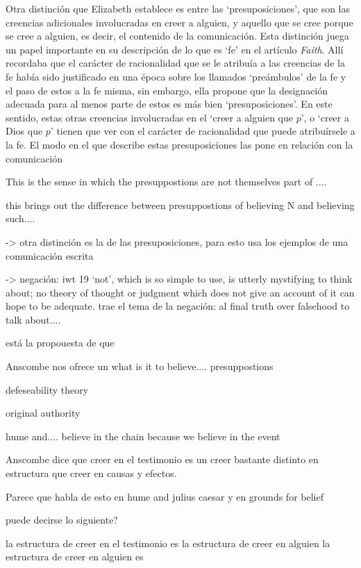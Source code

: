 Otra distinción que Elizabeth establece es entre las `presuposiciones', que son las creencias adicionales involucradas en creer a alguien, y aquello que se cree porque se cree a alguien, es decir, el contenido de la comunicación. Esta distinción juega un papel importante en su descripción de lo que es `fe' en el artículo \emph{Faith}. Allí recordaba que el carácter de racionalidad que se le atribuía a las creencias de la fe había sido justificado en una época sobre los llamados `preámbulos' de la fe y el paso de estos a la fe misma, sin embargo, ella propone que la designación adecuada para al menos parte de estos es más bien `presuposiciones'. En este sentido, estas otras creencias involucradas en el `creer a alguien que $p$', o `creer a Dios que $p$' tienen que ver con el carácter de racionalidad que puede atribuírsele a la fe. El modo en el que describe estas presuposiciones las pone en relación con la comunicación


 This is the sense in which the presuppostions are not themselves part of ....

this brings out the difference between presuppostions of believing N and believing such....



-> otra distinción es la de las presuposiciones, para esto usa los ejemplos de una comunicación escrita

-> negación: iwt 19 `not', which is so simple to use, is utterly mystifying to think about; no theory of thought or judgment which does not give an account of it can hope to be adequate.
trae el tema de la negación: al final truth over falsehood to talk about....

está la propouesta de que

Anscombe nos ofrece un
what is it to believe.... presuppostions

defeseability theory

original authority

hume and.... believe in the chain because we believe in the event


Anscombe dice que creer en el testimonio es un creer bastante distinto en estructura
que creer en causas y efectos.

Parece que habla de esto en hume and julius caesar y en grounds for belief

puede decirse lo siguiente?

la estructura de creer en el testimonio es la estructura de creer en alguien
la estructura de creer en alguien es

